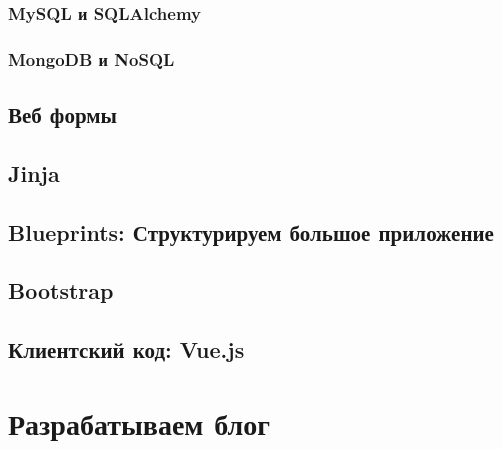 \subsection{MySQL и SQLAlchemy}

\subsection{MongoDB и NoSQL}

\section{Веб формы}

\section{Jinja}

\section{Blueprints: Структурируем большое приложение}

\section{Bootstrap}

\section{Клиентский код: Vue.js}

\chapter{Разрабатываем блог}


